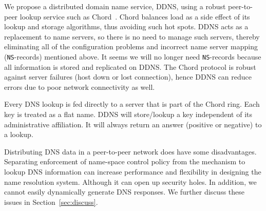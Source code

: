 We propose a distributed domain name service, DDNS,
using a robust peer-to-peer lookup service such as Chord~\cite{chord:sigcomm}.
Chord balances load as a side effect of its lookup and storage 
algorithms, thus avoiding such hot spots.
DDNS acts as a replacement to name servers, so there is no need 
to manage such servers, thereby eliminating all of 
the configuration problems and incorrect name server mapping 
({\tt NS}-records) mentioned above. It seems we will no longer need
{\tt NS}-records because all information is stored and replicated
on DDNS.
The Chord protocol is robust against server failures 
(host down or lost connection),
hence DDNS can reduce errors due to poor network connectivity as well.

Every DNS lookup is fed directly to a server that is part of 
the Chord ring. Each key is treated as a flat name. DDNS
will store/lookup a key independent of its administrative 
affiliation. It will always return an answer 
(positive or negative) to a lookup. 
 
Distributing DNS data in a peer-to-peer network does have some
disadvantages. Separating enforcement of name-space control 
policy from the mechanism to lookup DNS information 
can increase performance and flexibility 
in designing the name resolution system. Although it can open up 
security holes. 
In addition, we cannot easily dynamically 
generate DNS responses. We further discuss these issues 
in Section~\ref{sec:discuss}.


